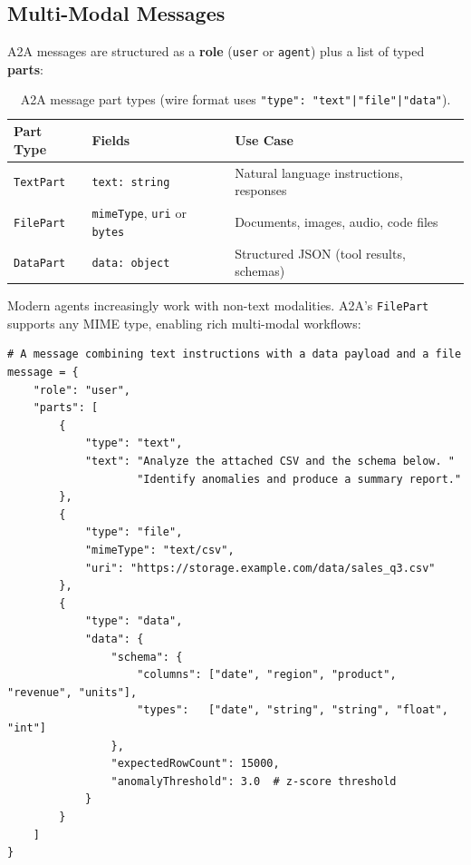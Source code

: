 \subsection{Multi-Modal Messages}
\label{multi-modal-messages}

A2A messages are structured as a \textbf{role} (\texttt{user} or \texttt{agent}) plus a list of typed \textbf{parts}:

\begin{table}[ht!]
\centering
\caption{A2A message part types (wire format uses \texttt{"type": "text"|"file"|"data"}).}
\begin{tabular}{@{}lp{5cm}p{8cm}@{}}
\toprule
\textbf{Part Type} & \textbf{Fields} & \textbf{Use Case} \\
\midrule
\texttt{TextPart} & \texttt{text: string} & Natural language instructions, responses \\
\texttt{FilePart} & \texttt{mimeType}, \texttt{uri} or \texttt{bytes} & Documents, images, audio, code files \\
\texttt{DataPart} & \texttt{data: object} & Structured JSON (tool results, schemas) \\
\bottomrule
\end{tabular}
\end{table}

Modern agents increasingly work with non-text modalities. A2A’s \texttt{FilePart} supports any MIME type, enabling rich multi-modal workflows:

\begin{examplebox}
\begin{lstlisting}[style=pythonstyle]
# A message combining text instructions with a data payload and a file
message = {
    "role": "user",
    "parts": [
        {
            "type": "text",
            "text": "Analyze the attached CSV and the schema below. "
                    "Identify anomalies and produce a summary report."
        },
        {
            "type": "file",
            "mimeType": "text/csv",
            "uri": "https://storage.example.com/data/sales_q3.csv"
        },
        {
            "type": "data",
            "data": {
                "schema": {
                    "columns": ["date", "region", "product", "revenue", "units"],
                    "types":   ["date", "string", "string", "float", "int"]
                },
                "expectedRowCount": 15000,
                "anomalyThreshold": 3.0  # z-score threshold
            }
        }
    ]
}
\end{lstlisting}
\end{examplebox}

